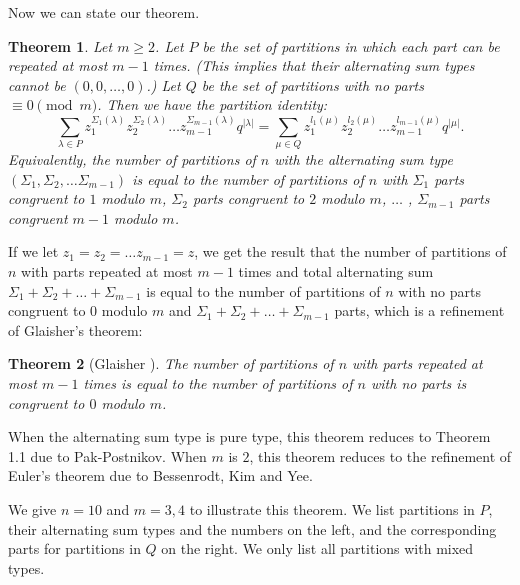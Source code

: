 \documentclass{amsart}
\newtheorem{theorem}{Theorem}
\newtheorem{example}{Example}
\begin{document}

Now we can state our theorem.
\begin{theorem}
Let $m\geq 2$. Let $P$ be the set of partitions in which each part can be repeated at most $m-1$ times. (This implies that their alternating sum types cannot be $(0,0,\dots,0)$.) Let $Q$ be the set of partitions with no parts $\equiv 0\pmod m$. Then we have the partition identity:
$$
\sum_{\lambda \in P} z_{1}^{\Sigma_{1}(\lambda)}  z_{2}^{\Sigma_{2}(\lambda)      }  \dots z_{m-1} ^{\Sigma_{m-1}(\lambda)          }  q^{|\lambda |}      =        \sum_{\mu \in Q} z_{1}^{l_{1}(\mu)}  z_{2}^{l_{2}(\mu)      }  \dots z_{m-1} ^{l_{m-1}(\mu)          }  q^{|\mu |}.   
 $$
Equivalently,  the number of partitions  of $n$ with the alternating sum type $(\Sigma_{1}, \Sigma_{2}, \dots \Sigma_{m-1})$ is equal to the number of partitions of $n$ with $\Sigma_{1}$ parts congruent to $1$ modulo $m$, $\Sigma_{2}$ parts congruent to $2$ modulo $m$, $\dots$ , $\Sigma_{m-1}$ parts congruent $m-1$ modulo $m$.
\end{theorem}

If we let $z_{1}=z_{2}=\dots z_{m-1}=z$, we get the result that the number of partitions of $n$ with parts repeated at most $m-1$ times and total alternating sum $\Sigma_{1}+\Sigma_{2}+\dots +\Sigma_{m-1}$ is equal to the number of partitions of $n$ with no parts congruent to $0$ modulo $m$  and $\Sigma_{1}+\Sigma_{2}+\dots +\Sigma_{m-1}$ parts, which is a refinement of Glaisher's theorem:
\begin{theorem}[Glaisher \cite{Pak}]
The number of partitions of $n$ with parts repeated  at most $m-1$ times is equal to the number of partitions of $n$ with no parts is congruent to $0$ modulo $m$.
\end{theorem}
When the alternating sum type is pure type, this theorem reduces to Theorem 1.1 due to Pak-Postnikov. When $m$ is $2$, this theorem reduces to the refinement of Euler's theorem due to Bessenrodt, Kim and Yee.

We give $n=10$ and $m=3, 4$ to illustrate this theorem. 
We list partitions in $P$, their alternating sum types and the numbers on the left, and the corresponding parts for partitions in $Q$ on the right. We only list all partitions with mixed types.
\end{document}
